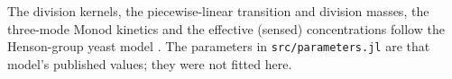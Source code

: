 \documentclass[11pt,a4paper]{article}
\begin{document}
\nocite{kumar1996fixedpivot,kumar2006cellaverage,kumar2008efficient,%
ramkrishna2000population,zhu2000mpc,zhang2002cell,henson2003dynamic}



\noindent The division kernels, the piecewise-linear transition and division masses, the
three-mode Monod kinetics and the effective (sensed) concentrations follow the Henson-group
yeast model \cite{zhu2000mpc,zhang2002cell,henson2003dynamic}. The parameters in
\texttt{src/parameters.jl} are that model's published values; they were not fitted here.
\end{document}
